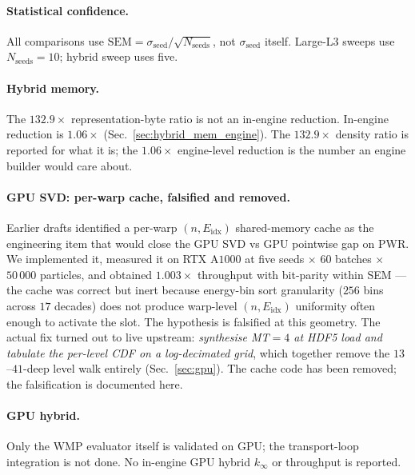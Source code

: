 \paragraph{Statistical confidence.}
All comparisons use $\mathrm{SEM} =
\sigma_\text{seed}/\sqrt{N_\text{seeds}}$, not
$\sigma_\text{seed}$ itself. Large-L3 sweeps use
$N_\text{seeds} = 10$; hybrid sweep uses five.

\paragraph{Hybrid memory.}
The $132.9\times$ representation-byte ratio is not an
in-engine reduction. In-engine reduction is $1.06\times$
(Sec.~\ref{sec:hybrid_mem_engine}). The $132.9\times$
density ratio is reported for what it is; the
$1.06\times$ engine-level reduction is the number an
engine builder would care about.

\paragraph{GPU SVD: per-warp cache, falsified and removed.}
Earlier drafts identified a per-warp $(n, E_\text{idx})$
shared-memory cache as the engineering item that would close the
GPU SVD vs GPU pointwise gap on PWR. We implemented it, measured
it on RTX A$1000$ at five seeds $\times$ $60$ batches $\times$
$50\,000$ particles, and obtained $1.003\times$ throughput with
bit-parity within SEM --- the cache was correct but inert because
energy-bin sort granularity ($256$ bins across $17$ decades) does
not produce warp-level $(n, E_\text{idx})$ uniformity often enough
to activate the slot. The hypothesis is falsified at this
geometry. The actual fix turned out to live upstream:
\emph{synthesise MT$=4$ at HDF5 load and tabulate the per-level
CDF on a log-decimated grid}, which together remove the
$13$--$41$-deep level walk entirely (Sec.~\ref{sec:gpu}). The
cache code has been removed; the falsification is documented here.

\paragraph{GPU hybrid.}
Only the WMP evaluator itself is validated on GPU; the
transport-loop integration is not done. No in-engine GPU
hybrid $k_\infty$ or throughput is reported.

